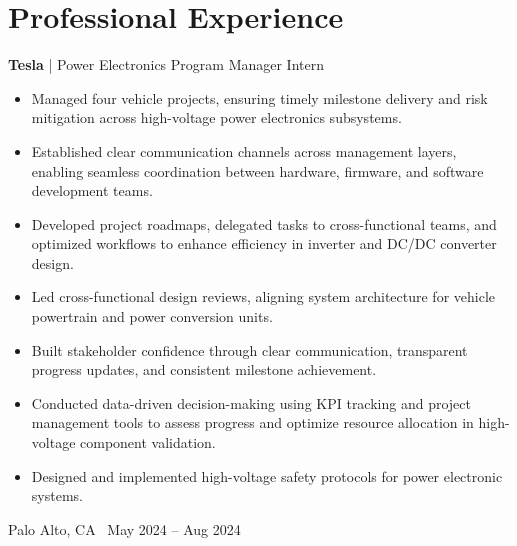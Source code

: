 \documentclass[10pt, letterpaper]{article}
\newenvironment{highlights}{
    \begin{itemize}[
        topsep=0.10 cm,
        parsep=0.10 cm,
        partopsep=0pt,
        itemsep=0pt,
        leftmargin=0.4 cm + 10pt
    ]
}{
    \end{itemize}
} %
\newenvironment{twocolentry}[2][]{
    \onecolentry
    \def\secondColumn{#2}
    \setcolumnwidth{\fill, 4.5 cm}
    \begin{paracol}{2}
}{
    \switchcolumn \raggedleft \secondColumn
    \end{paracol}
    \endonecolentry
} %
\begin{document}
        \section{Professional Experience}
        \begin{twocolentry}{Palo Alto, CA \ May 2024 – Aug 2024}
        \textbf{Tesla} | Power Electronics Program Manager Intern
        \begin{highlights}
        \item Managed four vehicle projects, ensuring timely milestone delivery and risk mitigation across high-voltage power electronics subsystems.
        \item Established clear communication channels across management layers, enabling seamless coordination between hardware, firmware, and software development teams.
        \item Developed project roadmaps, delegated tasks to cross-functional teams, and optimized workflows to enhance efficiency in inverter and DC/DC converter design.
        \item Led cross-functional design reviews, aligning system architecture for vehicle powertrain and power conversion units.
        \item Built stakeholder confidence through clear communication, transparent progress updates, and consistent milestone achievement.
        \item Conducted data-driven decision-making using KPI tracking and project management tools to assess progress and optimize resource allocation in high-voltage component validation.
        \item Designed and implemented high-voltage safety protocols for power electronic systems.
        \end{highlights}
        \end{twocolentry}
        
        \vspace{0.2 cm}
        
\end{document}
